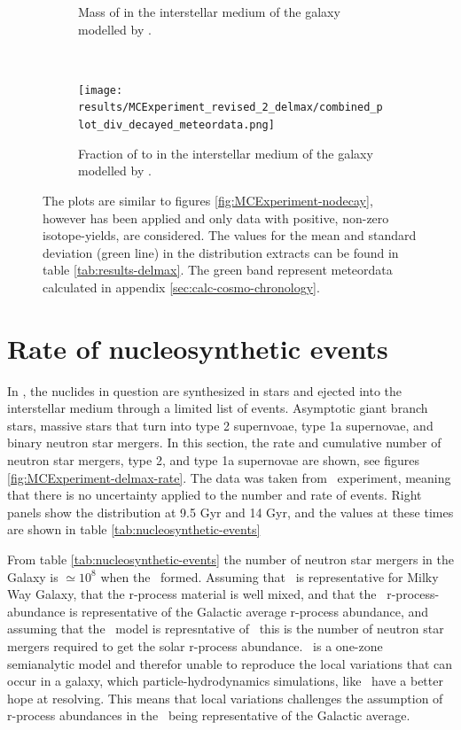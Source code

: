 \begin{figure}
\begin{subfigure}{\subfigwidth}
{      Mass of  in the interstellar medium of the galaxy modelled by \omegamodel.
    }
  \end{subfigure} \\
  \centering
  \begin{subfigure}{\figwidth}
    \texttt{[image: results/MCExperiment\_revised\_2\_delmax/combined\_plot\_div\_decayed\_meteordata.png]}
    \caption{ \label{fig:MCExperiment-delmax-div} \footnotesize
      Fraction of  to  in the interstellar medium of the galaxy modelled by \omegamodel.
    }
  \end{subfigure}
  \caption[\expone\ with \betadecay and removing negative isotope yields]{ \label{fig:MCExperiment-delmax}
    The plots are similar to figures \ref{fig:MCExperiment-nodecay}, however \betadecay has been applied and only data with positive, non-zero isotope-yields, are considered.
    The values for the mean and standard deviation (green line) in the distribution extracts can be found in table \ref{tab:results-delmax}.
    The green band represent meteordata calculated in appendix \ref{sec:calc-cosmo-chronology}.
  }
\end{figure}
\FloatBarrier %

\section{Rate of nucleosynthetic events} \label{sec:nucleosynthetic-events}
In \omegamodel, the nuclides in question are synthesized in stars and ejected into the interstellar medium through a limited list of events.
Asymptotic giant branch stars, massive stars that turn into type 2 supernvoae, type 1a supernovae, and binary neutron star mergers.
In this section, the rate and cumulative number of neutron star mergers, type 2, and type 1a supernovae are shown, see figures \ref{fig:MCExperiment-delmax-rate}.
The data was taken from \expone\ experiment, meaning that there is no uncertainty applied to the number and rate of events.
Right panels show the distribution at 9.5 Gyr and 14 Gyr, and the values at these times are shown in table \ref{tab:nucleosynthetic-events}

From table \ref{tab:nucleosynthetic-events} the number of neutron star mergers in the Galaxy is $\simeq10^8$ when the \sos\ formed.
Assuming that \eris\ is representative for Milky Way Galaxy, that the r-process material is well mixed, and that the \sos\ r-process-abundance is representative of the Galactic average r-process abundance, and assuming that the \fiduccialomega\ model is represntative of \eris\ this is the number of neutron star mergers required to get the solar r-process abundance.
\omegamodel\ is a one-zone semianalytic model and therefor unable to reproduce the local variations that can occur in a galaxy, which particle-hydrodynamics simulations, like \eris\ have a better hope at resolving.
This means that local variations challenges the assumption of r-process abundances in the \sos\ being representative of the Galactic average.


